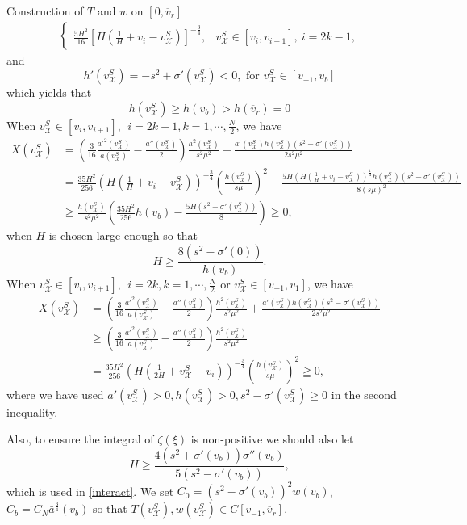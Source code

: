 \documentclass[12pt,reqno]{amsart}
\numberwithin{equation}{section}
\def\R{\mathbb{R}}
\def\vsx{v^S_{\mathcal{X}}}
\def\avr{\overline{v}_r}
\begin{document}
\begin{part}{Construction of $T$ and $w$ on $[0,\avr]$}
\begin{align*}
\begin{cases}
		\frac{5H^2}{16}[H(\frac{1}{H}+v_{i}-\vsx)]^{-\frac{3}{4}},&\vsx \in [v_{i},v_{i+1}],~ i=2k-1,
	\end{cases}
\end{align*}
and 
$$h'(\vsx)=-s^2+\sigma'(\vsx)<0,\text{ for }\vsx\in[v_{-1},v_b]$$
which yields that
\begin{equation*}
	h(\vsx)\geq h(v_b)>h(\avr)=0
\end{equation*}
When $\vsx \in [v_{i},v_{i+1}],~~i=2k-1,k=1,\cdots,\frac{N}{2}$, we have 
\begin{equation}\label{Xodd}
	\begin{aligned}
		X(\vsx)&=\left(\frac{3}{16}\frac{a'^2(\vsx)}{a(\vsx)}-\frac{a''(\vsx)}{2}\right)\frac{h^2(\vsx)}{s^2\mu^2}+\frac{a'(\vsx)h(\vsx)(s^2-\sigma'(\vsx))}{2s^2\mu^2}\\
		&=\frac{35H^2}{256}(H(\frac{1}{H}+v_i-\vsx))^{-\frac{3}{4}}(\frac{h(\vsx)}{s\mu})^2-\frac{5H(H(\frac{1}{H}+v_i-\vsx))^\frac{1}{4}h(\vsx)(s^2-\sigma'(\vsx))}{8(s\mu)^2}\\
		&\geq\frac{h(\vsx)}{s^2\mu^2}\left(\frac{35H^2}{256}h(v_b)-\frac{5H(s^2-\sigma'(\vsx))}{8}\right)\geq0,
	\end{aligned}
\end{equation}
when $H$ is chosen large enough so that
\begin{equation}
	H\geq \frac{8(s^2-\sigma'(0))}{h(v_b)}.
\end{equation}
When $\vsx \in [v_{i},v_{i+1}],~~i=2k,k=1,\cdots,\frac{N}{2}$ or $\vsx\in[v_{-1},v_1]$, we have
\begin{equation}\label{Xeven}
	\begin{aligned}
		X(\vsx)&=\left(\frac{3}{16}\frac{a'^2(\vsx)}{a(\vsx)}-\frac{a''(\vsx)}{2}\right)\frac{h^2(\vsx)}{s^2\mu^2}+\frac{a'(\vsx)h(\vsx)(s^2-\sigma'(\vsx))}{2s^2\mu^2}\\
		&\geq \left(\frac{3}{16}\frac{a'^2(\vsx)}{a(\vsx)}-\frac{a''(\vsx)}{2}\right)\frac{h^2(\vsx)}{s^2\mu^2}\\
		&=\frac{35H^2}{256}(H(\frac{1}{2H}+\vsx-v_i))^{-\frac{3}{4}}(\frac{h(\vsx)}{s\mu})^2\geqq0,
	\end{aligned}
\end{equation}
where we have used $a'(\vsx)>0,h(\vsx)>0,s^2-\sigma'(\vsx)\geq0$ in the second inequality.

Also, to ensure the integral of $\zeta(\xi)$ is non-positive we should also let 
\begin{equation}\label{Hbig}
	H\geq\frac{4(s^2+\sigma'(v_b))\sigma''(v_b)}{5(s^2-\sigma'(v_b))},
\end{equation}
which is used in \eqref{interact}. We set $C_0=(s^2-\sigma'(v_b))^2\bar{w}(v_b)$, $C_b=C_N\bar{a}^\frac{3}{4}(v_b)$ so that $T(\vsx), w(\vsx) \in C[v_{-1},\avr]$. 


\end{part}
\end{document}
